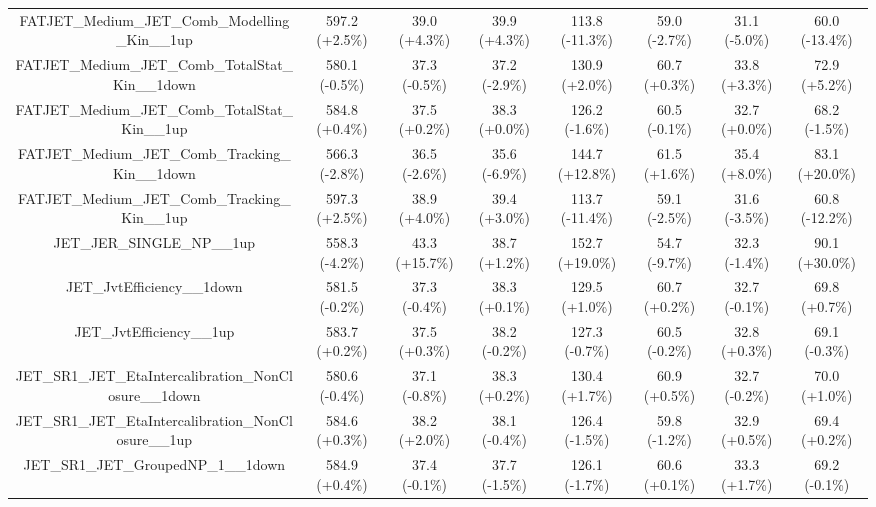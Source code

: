 \begin{table}[htbp!]
\begin{tiny}
\begin{center}
\begin{tabular}{c|c|c|c||c|c|c|c}
FATJET\_Medium\_JET\_Comb\_Modelling\_Kin\_\_1up             & 597.2     (+2.5\%) & 39.0      (+4.3\%) & 39.9      (+4.3\%) & 113.8     (-11.3\%) & 59.0      (-2.7\%) & 31.1      (-5.0\%) & 60.0      (-13.4\%) \\ 
FATJET\_Medium\_JET\_Comb\_TotalStat\_Kin\_\_1down           & 580.1     (-0.5\%) & 37.3      (-0.5\%) & 37.2      (-2.9\%) & 130.9     (+2.0\%) & 60.7      (+0.3\%) & 33.8      (+3.3\%) & 72.9      (+5.2\%) \\ 
FATJET\_Medium\_JET\_Comb\_TotalStat\_Kin\_\_1up             & 584.8     (+0.4\%) & 37.5      (+0.2\%) & 38.3      (+0.0\%) & 126.2     (-1.6\%) & 60.5      (-0.1\%) & 32.7      (+0.0\%) & 68.2      (-1.5\%) \\ 
FATJET\_Medium\_JET\_Comb\_Tracking\_Kin\_\_1down            & 566.3     (-2.8\%) & 36.5      (-2.6\%) & 35.6      (-6.9\%) & 144.7     (+12.8\%) & 61.5      (+1.6\%) & 35.4      (+8.0\%) & 83.1      (+20.0\%) \\ 
FATJET\_Medium\_JET\_Comb\_Tracking\_Kin\_\_1up              & 597.3     (+2.5\%) & 38.9      (+4.0\%) & 39.4      (+3.0\%) & 113.7     (-11.4\%) & 59.1      (-2.5\%) & 31.6      (-3.5\%) & 60.8      (-12.2\%) \\ 
JET\_JER\_SINGLE\_NP\_\_1up                                  & 558.3     (-4.2\%) & 43.3      (+15.7\%) & 38.7      (+1.2\%) & 152.7     (+19.0\%) & 54.7      (-9.7\%) & 32.3      (-1.4\%) & 90.1      (+30.0\%) \\ 
JET\_JvtEfficiency\_\_1down                                  & 581.5     (-0.2\%) & 37.3      (-0.4\%) & 38.3      (+0.1\%) & 129.5     (+1.0\%) & 60.7      (+0.2\%) & 32.7      (-0.1\%) & 69.8      (+0.7\%) \\ 
JET\_JvtEfficiency\_\_1up                                    & 583.7     (+0.2\%) & 37.5      (+0.3\%) & 38.2      (-0.2\%) & 127.3     (-0.7\%) & 60.5      (-0.2\%) & 32.8      (+0.3\%) & 69.1      (-0.3\%) \\ 
JET\_SR1\_JET\_EtaIntercalibration\_NonClosure\_\_1down      & 580.6     (-0.4\%) & 37.1      (-0.8\%) & 38.3      (+0.2\%) & 130.4     (+1.7\%) & 60.9      (+0.5\%) & 32.7      (-0.2\%) & 70.0      (+1.0\%) \\ 
JET\_SR1\_JET\_EtaIntercalibration\_NonClosure\_\_1up        & 584.6     (+0.3\%) & 38.2      (+2.0\%) & 38.1      (-0.4\%) & 126.4     (-1.5\%) & 59.8      (-1.2\%) & 32.9      (+0.5\%) & 69.4      (+0.2\%) \\ 
JET\_SR1\_JET\_GroupedNP\_1\_\_1down                         & 584.9     (+0.4\%) & 37.4      (-0.1\%) & 37.7      (-1.5\%) & 126.1     (-1.7\%) & 60.6      (+0.1\%) & 33.3      (+1.7\%) & 69.2      (-0.1\%) \\ 

\end{tabular}
\end{center}
\end{tiny}
\end{table}
